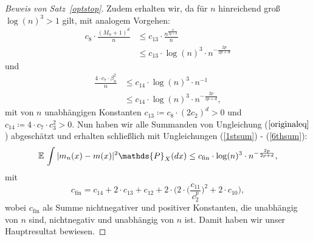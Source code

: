 \begin{proof}[Beweis von Satz~\ref{optstop}]
Zudem erhalten wir, da für $n$ hinreichend groß $\log(n)^3 > 1$ gilt, mit analogem Vorgehen:
\begin{equation}
\label{5thsum}
\begin{split}
c_8 \cdot \frac{(M_n + 1)^d}{n} & \leq c_{13} \cdot \frac{n^{\frac{d}{2p + d}}}{n} \\
& \leq c_{13} \cdot \log(n)^3 \cdot n^{- \frac{2p}{2p + d}} 
\end{split}
\end{equation} 
und 
\begin{equation}
\label{6thsum}
\begin{split}
\frac{4 \cdot c_7 \cdot \beta_n^2}{n} & \leq c_{14} \cdot \log(n)^3 \cdot n^{-1} \\
& \leq c_{14} \cdot \log(n)^3 \cdot n^{- \frac{2p}{2p + d}},
\end{split}
\end{equation} 
mit von $n$ unabhängigen Konstanten $c_{13} \coloneqq c_8 \cdot (2c_2)^d > 0$ und $c_{14} \coloneqq 4 \cdot c_7 \cdot c_3^2 > 0$.
Nun haben wir alle Summanden von Ungleichung ($\ref{originaleq}$) abgeschätzt und erhalten schließlich mit Ungleichungen (\ref{1stsum}) - (\ref{6thsum}):
\begin{equation*}
\E \int |m_n(x) - m(x)|^2 \mathds{P}_X(dx) \leq c_{\text{fin}} \cdot \log(n)^3 \cdot n^{- \frac{2p}{2p + d}},
\end{equation*}
mit 
$$c_{\text{fin}} = c_{14} + 2 \cdot c_{13} + c_{12} + 2 \cdot \Bigg(2 \cdot \bigg(\frac{c_{11}}{c_2^p}\bigg)^2 + 2 \cdot  c_{10}\Bigg),$$
wobei $c_{\text{fin}}$ als Summe nichtnegativer und positiver Konstanten, die unabhängig von $n$ sind, nichtnegativ und unabhängig von $n$ ist.
Damit haben wir unser Hauptresultat bewiesen.
\end{proof}